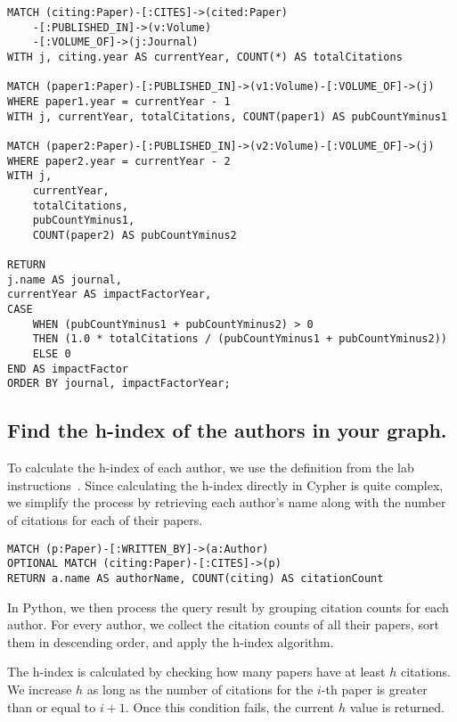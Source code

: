 \documentclass{article}
\begin{document}
\begin{verbatim}
MATCH (citing:Paper)-[:CITES]->(cited:Paper)
    -[:PUBLISHED_IN]->(v:Volume)
    -[:VOLUME_OF]->(j:Journal)
WITH j, citing.year AS currentYear, COUNT(*) AS totalCitations
                 
MATCH (paper1:Paper)-[:PUBLISHED_IN]->(v1:Volume)-[:VOLUME_OF]->(j)
WHERE paper1.year = currentYear - 1
WITH j, currentYear, totalCitations, COUNT(paper1) AS pubCountYminus1   

MATCH (paper2:Paper)-[:PUBLISHED_IN]->(v2:Volume)-[:VOLUME_OF]->(j)
WHERE paper2.year = currentYear - 2
WITH j, 
    currentYear, 
    totalCitations, 
    pubCountYminus1, 
    COUNT(paper2) AS pubCountYminus2   
                 
RETURN 
j.name AS journal, 
currentYear AS impactFactorYear,
CASE 
    WHEN (pubCountYminus1 + pubCountYminus2) > 0 
    THEN (1.0 * totalCitations / (pubCountYminus1 + pubCountYminus2))
    ELSE 0
END AS impactFactor
ORDER BY journal, impactFactorYear;
\end{verbatim}


\subsection{Find the h-index of the authors in your graph.}

To calculate the h-index of each author, we use the definition from the lab instructions~\cite{wikipediacontributors_2020_hindex}. Since calculating the h-index directly in Cypher is quite complex, we simplify the process by retrieving each author's name along with the number of citations for each of their papers.

\begin{verbatim}
MATCH (p:Paper)-[:WRITTEN_BY]->(a:Author)
OPTIONAL MATCH (citing:Paper)-[:CITES]->(p)
RETURN a.name AS authorName, COUNT(citing) AS citationCount
\end{verbatim}

In Python, we then process the query result by grouping citation counts for each author. For every author, we collect the citation counts of all their papers, sort them in descending order, and apply the h-index algorithm.

The h-index is calculated by checking how many papers have at least \( h \) citations. We increase \( h \) as long as the number of citations for the \( i \)-th paper is greater than or equal to \( i+1 \). Once this condition fails, the current \( h \) value is returned.
\end{document}
